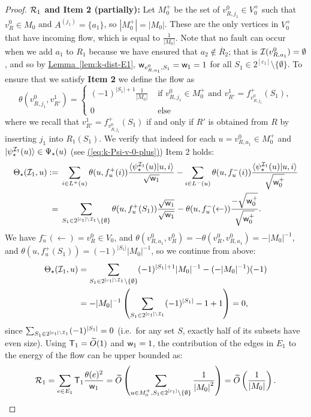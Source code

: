 \documentclass{theoretics}
\newcommand{\eq}[1]{\hyperref[eq:#1]{(\ref*{eq:#1})}}
\newcommand{\lem}[1]{\hyperref[lem:#1]{Lemma~\ref*{lem:#1}}}
\def\ket#1{{\lvert}#1\rangle}
\renewcommand{\>}{\rangle}
\newcommand{\<}{\langle}
\renewcommand{\(}{\left(}
\renewcommand{\)}{\right)}
\def\braket#1#2{{{\langle}#1\vert}#2\rangle}
\def\abs#1{\left| #1 \right|}
\def\w{{\sf w}}
\begin{document}
\begin{proof}
\vskip7pt		
\noindent\textbf{${\cal R}_1$ and Item 2 (partially):} Let $M_0^+$ be the set of $v^{0}_{R,j_1} \in V_0^+$ such that $v^{0}_{R}\in M_0$ and $A^{(j_1)}=\{a_1\}$, so $\abs{M_0^+}=\abs{M_0}$. These are the only vertices in $V_0^+$ that have incoming flow, which is equal to $\frac{1}{\abs{M_0}}$. Note that no fault can occur when we add $a_1$ to $R_1$ because we have ensured that $a_2\not\in \overline{R}_2$; that is ${\cal I}(v^0_{R,a_1})=\emptyset$, and so by \lem{k-dist-E1}, $\w_{v^0_{R,a_1},S_1}=\w_1=1$ for all $S_1\in 2^{[c_1]}\setminus\{\emptyset\}$. 
To ensure that we satisfy \textbf{Item 2} we define the flow as
		$$\theta(v^0_{R,j_1},v^1_{R'}) = \begin{cases}
			(-1)^{\abs{S_1}+1}\frac{1}{\abs{M_0}} &\text{ if } v^0_{R,j_1} \in M_0^+\mbox{ and }v_{R'}^1=f^+_{v_{R,j_1}^0}(S_1),\\
			0 &\text{ else}
		\end{cases}$$
where we recall that $v_{R'}^1=f^+_{v_{R,j_1}^0}(S_1)$ if and only if $R'$ is obtained from $R$ by inserting $j_1$ into $R_1(S_1)$. 
		We verify that indeed for each $u=v_{R,a_1}^0 \in M_0^+$ and $\ket{\psi^{{\cal I}_1}_\star(u)}\in \Psi_\star(u)$ (see \eq{k-Psi-v-0-plus}) Item 2 holds:
\begin{equation}
\begin{split}
\Theta_\star({\cal I}_1,u):={}&\sum_{i\in L^+(u)}\theta(u,f^+_{u}(i))\frac{\braket{\psi_\star^{{\cal I}_1}(u)}{u,i}}{\sqrt{\w_1}}-\sum_{i\in L^-(u)}\theta(u,f^-_{u}(i))\frac{\braket{\psi_\star^{{\cal I}_1}(u)}{u,i}}{\sqrt{\w_0^+}}\\
={}& \sum_{S_1 \in 2^{[c_1]\setminus {\cal I}_1} \setminus \{\emptyset\}}\theta(u,f^+_{u}(S_1))\frac{\sqrt{\w_1}}{\sqrt{\w_1}}-\theta(u,f^-_{u}(\leftarrow))\frac{-\sqrt{\w_0^+}}{\sqrt{\w_0^+}}.
\end{split}\label{eq:k-dist-pos-flow-1}
\end{equation}
We have $f^-_u(\leftarrow)=v_R^0\in V_0$, and $\theta(v_{R,a_1}^0,v_R^0)=-\theta(v_R^0,v_{R,a_1}^0)=-|M_0|^{-1}$, and $\theta(u,f^+_u(S_1))=(-1)^{|S_1|}|M_0|^{-1}$, so we continue from above:
\begin{equation}
\begin{split}
\Theta_\star({\cal I}_1,u)&= \sum_{S_1 \in 2^{[c_1]\setminus {\cal I}_1} \setminus \{\emptyset\}}(-1)^{|S_1|+1}|M_0|^{-1}-(-|M_0|^{-1})(-1)\\
&= -|M_0|^{-1}\left(\sum_{S_1\in 2^{[c_1]\setminus {\cal I}_1}}(-1)^{|S_1|}-1+1 \right)=0,
\end{split}\label{eq:k-dist-pos-flow-2}
\end{equation}
since $\sum_{S_1\in 2^{[c_1]\setminus {\cal I}_1}}(-1)^{|S_1|}=0$ (i.e.~for any set $S$, exactly half of its subsets have even size). 
Using ${\sf T}_1=\widetilde{O}(1)$ and ${\sf w}_1=1$, the contribution of the edges in $E_1$ to the energy of the flow can be upper bounded as:
		\begin{equation}
			{\cal R}_1 = \sum_{e\in E_1}{\sf T}_1\frac{\theta(e)^2}{\w_1} = \widetilde{O}\left(\sum_{\substack{u \in M_0^+, S_1 \in 2^{[c_1]} \setminus \{\emptyset\}}}\frac{1}{\abs{M_0}^2}\right)=\widetilde{O}\left(\frac{1}{\abs{M_0}}\right).\label{eq:k-R1}
		\end{equation}
		

\end{proof}
\end{document}
